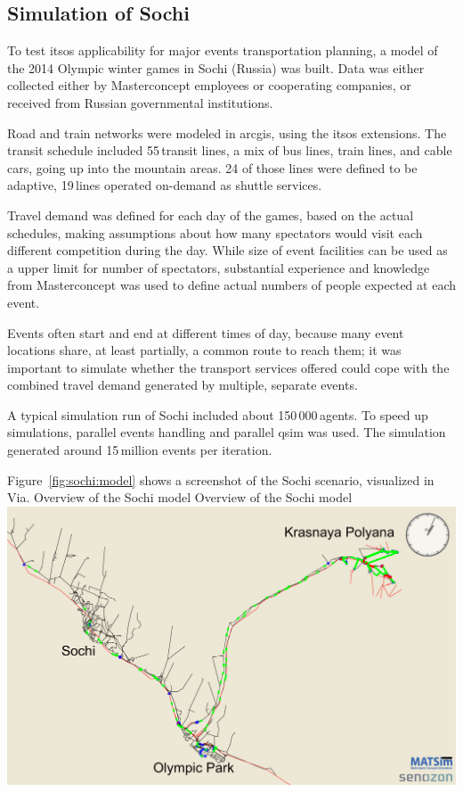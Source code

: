 \subsection{Simulation of Sochi}
To test \gls{itsos} applicability for major events transportation planning,
a model of the 2014 Olympic winter games in Sochi (Russia) was built. Data was
either collected either by Masterconcept employees or cooperating companies, or
received from Russian governmental institutions.

Road and train networks were modeled in \gls{arcgis}, using the \gls{itsos} extensions.
The transit schedule included 55\,transit lines, a mix of bus lines, train lines,
and cable cars, going up into the mountain areas. 24 of those lines were
defined to be adaptive, 19\,lines operated on-demand as shuttle services.

Travel demand was defined for each day of the games, based on the actual schedules,
making assumptions about how many spectators would visit each different
competition during the day. While size of event facilities can be used as a
upper limit for number of spectators, substantial experience and knowledge from
Masterconcept was used to define actual numbers of people expected at each
event.

Events often start and end at different times of day, because many event locations share, at least partially, a
common route to reach them; it was important to simulate whether the transport services offered could
cope with the combined travel demand generated by multiple, separate events.

A typical simulation run of Sochi included about 150\,000\,agents. To speed up simulations, parallel events handling and parallel qsim was used. The simulation generated around 15\,million events per iteration.

Figure~\ref{fig:sochi:model} shows a screenshot of the Sochi scenario, visualized in Via.
%
\createfigure%
{Overview of the Sochi model}%
{Overview of the Sochi model}%
{\label{fig:sochi:model}}%
{\includegraphics[width=1.\textwidth,angle=0]{./using/figures/sochi_full.pdf}}%
{}
%

